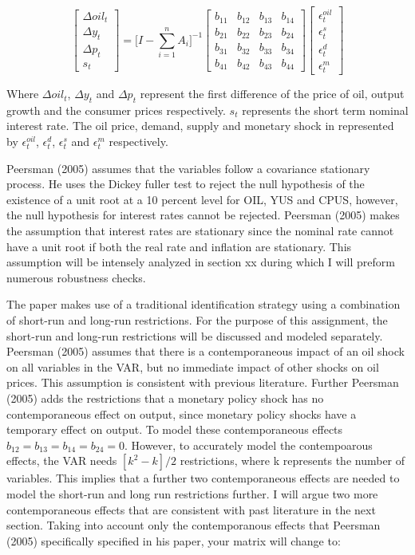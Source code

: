 \documentclass[11pt,preprint, authoryear]{elsarticle}
\numberwithin{equation}{section}
\numberwithin{figure}{section}
\numberwithin{table}{section}
\begin{document}
\[\begin{bmatrix} \Delta oil_t \\ \Delta y_t \\ \Delta p_t \\ s_t \end{bmatrix} = \Biggl[ I - \sum_{i=1}^{n} A_i \Biggl]^{-1} \begin{bmatrix} b_{11}& b_{12}& b_{13} & b_{14} \\
b_{21}& b_{22}& b_{23} & b_{24} \\
b_{31}& b_{32}& b_{33} & b_{34} \\
b_{41}& b_{42}& b_{43} & b_{44} \end{bmatrix} \begin{bmatrix} \epsilon_t^{oil} \\ \epsilon_t^{s} \\ \epsilon_t^{d} \\ \epsilon_t^{m} \end{bmatrix}\]

Where \(\Delta oil_t\), \(\Delta y_t\) and \(\Delta p_t\) represent the
first difference of the price of oil, output growth and the consumer
prices respectively. \(s_t\) represents the short term nominal interest
rate. The oil price, demand, supply and monetary shock in represented by
\(\epsilon_t^{oil}\), \(\epsilon_t^{d}\), \(\epsilon_t^{s}\) and
\(\epsilon_t^{m}\) respectively.

Peersman (2005) assumes that the variables follow a covariance
stationary process. He uses the Dickey fuller test to reject the null
hypothesis of the existence of a unit root at a 10 percent level for
OIL, YUS and CPUS, however, the null hypothesis for interest rates
cannot be rejected. Peersman (2005) makes the assumption that interest
rates are stationary since the nominal rate cannot have a unit root if
both the real rate and inflation are stationary. This assumption will be
intensely analyzed in section xx during which I will preform numerous
robustness checks.

The paper makes use of a traditional identification strategy using a
combination of short-run and long-run restrictions. For the purpose of
this assignment, the short-run and long-run restrictions will be
discussed and modeled separately. Peersman (2005) assumes that there is
a contemporaneous impact of an oil shock on all variables in the VAR,
but no immediate impact of other shocks on oil prices. This assumption
is consistent with previous literature. Further Peersman (2005) adds the
restrictions that a monetary policy shock has no contemporaneous effect
on output, since monetary policy shocks have a temporary effect on
output. To model these contemporaneous effects
\(b_{12} = b_{13} = b_{14} = b_{24} = 0\). However, to accurately model
the contempoarous effects, the VAR needs \([k^2-k]/2\) restrictions,
where k represents the number of variables. This implies that a further
two contemporaneous effects are needed to model the short-run and long
run restrictions further. I will argue two more contemporaneous effects
that are consistent with past literature in the next section. Taking
into account only the contemporanous effects that Peersman (2005)
specifically specified in his paper, your matrix will change to:
\end{document}
